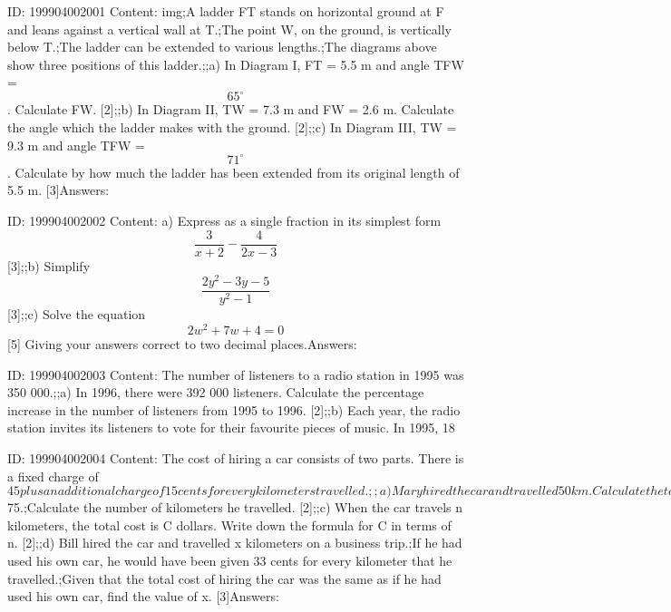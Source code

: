 \documentclass{article}
\begin{document}
ID: 199904002001
Content:
img;A ladder FT stands on horizontal ground at F and leans against a vertical wall at T.;The point W, on the ground, is vertically below T.;The ladder can be extended to various lengths.;The diagrams above show three positions of this ladder.;;a) In Diagram I, FT = 5.5 m and angle TFW = $$65^{\circ}$$. Calculate FW. [2];;b) In Diagram II, TW = 7.3 m and FW = 2.6 m. Calculate the angle which the ladder makes with the ground. [2];;c) In Diagram III, TW = 9.3 m and angle TFW = $$71^{\circ}$$. Calculate by how much the ladder has been extended from its original length of 5.5 m. [3]Answers:

ID: 199904002002
Content:
a) Express as a single fraction in its simplest form $$\frac{3}{x+2} - \frac{4}{2x-3}$$ [3];;b) Simplify $$\frac{2y^2 - 3y - 5}{y^2 - 1}$$ [3];;c) Solve the equation$$2w^2 + 7w + 4 = 0$$ [5] Giving your answers correct to two decimal places.Answers:

ID: 199904002003
Content:
The number of listeners to a radio station in 1995 was 350 000.;;a) In 1996, there were 392 000 listeners. Calculate the percentage increase in the number of listeners from 1995 to 1996. [2];;b) Each year, the radio station invites its listeners to vote for their favourite pieces of music. In 1995, 18%

ID: 199904002004
Content:
The cost of hiring a car consists of two parts. There is a fixed charge of $45 plus an additional charge of 15 cents for every kilometers travelled.;;a) Mary hired the car and travelled 50 km. Calculate the total amount she had to pay. [1];;b) John hired the car for a journey.;The total cost was $75.;Calculate the number of kilometers he travelled. [2];;c) When the car travels n kilometers, the total cost is C dollars. Write down the formula for C in terms of n. [2];;d) Bill hired the car and travelled x kilometers on a business trip.;If he had used his own car, he would have been given 33 cents for every kilometer that he travelled.;Given that the total cost of hiring the car was the same as if he had used his own car, find the value of x. [3]Answers:
\end{document}
